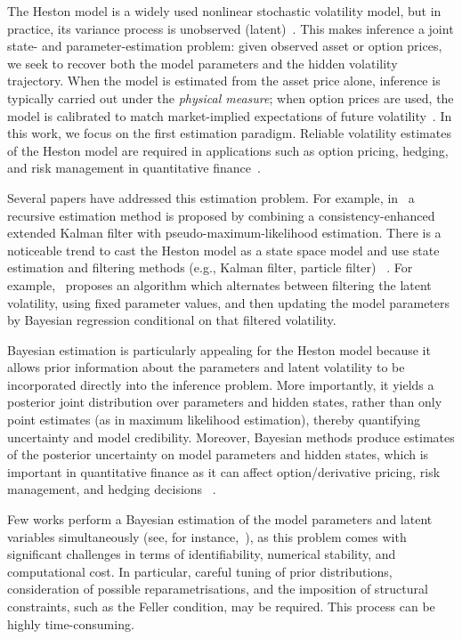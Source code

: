 \documentclass[11pt]{report}
\begin{document}
The Heston model is a widely used nonlinear
stochastic volatility model, but in practice, its variance process is unobserved (latent)~\cite{heston2015}. 
This makes inference a joint state- and parameter-estimation problem: given observed asset or option prices, we seek to recover both the 
model parameters and the hidden volatility trajectory. 
When the model is estimated from the asset price alone, inference 
is typically carried out under the \textit{physical measure}; when option prices are used, the model is calibrated to match 
market-implied expectations of future volatility~\cite{Cui2017}.
In this work, we focus on the first estimation paradigm. 
Reliable volatility estimates of the Heston model are required in 
applications such as option pricing, hedging, and risk management 
in quantitative finance~\cite{Als2012}.

Several papers have addressed this estimation problem. 
For example, in~\cite{WANG201714100} a recursive estimation method 
is proposed by combining a consistency-enhanced extended Kalman filter
with pseudo-maximum-likelihood estimation.
There is a noticeable trend to cast the Heston model as a state 
space model and use state estimation and filtering methods
(e.g., Kalman filter, particle filter)%
~\cite{BlancBlocquel2024,BaoFengZhang2025,Gruszka2022,Li2013}.
For example,~\cite{Gruszka2022} proposes an algorithm 
which alternates between filtering the latent volatility,
using fixed parameter values, and then updating the model parameters
by Bayesian regression conditional on that filtered volatility.

Bayesian estimation is particularly appealing for the Heston model 
because it allows prior information about the parameters and latent 
volatility to be incorporated directly into the inference problem. 
More importantly, it yields a posterior joint distribution over 
parameters and hidden states, rather than only point estimates (as in maximum 
likelihood estimation), 
thereby quantifying uncertainty and model credibility.
Moreover, Bayesian methods produce estimates of the posterior 
uncertainty on model parameters and hidden states, which is 
important in quantitative finance as it can affect option/derivative 
pricing, risk management, and hedging decisions 
~\cite{GuillaumeSchoutens2012}.

Few works perform a Bayesian estimation of the model parameters 
and latent variables simultaneously 
(see, for instance,~\cite{FruhwirthSchnatter2008}), 
as this problem comes with significant challenges in terms of 
identifiability, numerical stability, and computational cost. 
In particular, careful tuning of prior distributions, 
consideration of possible reparametrisations, and the imposition 
of structural constraints, such as the Feller condition, may be required. 
This process can be highly time-consuming.
\end{document}
